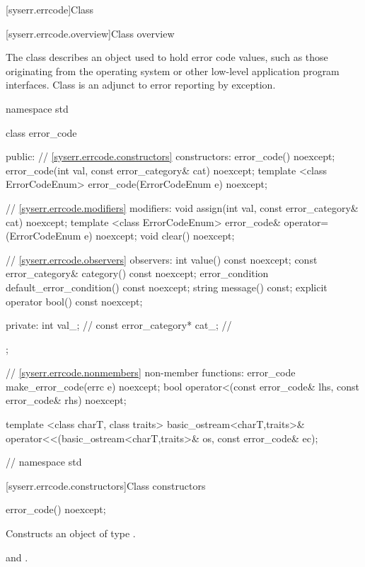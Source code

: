 [syserr.errcode]{Class }

[syserr.errcode.overview]{Class  overview}

\pnum
The class  describes an object used to hold error code
values, such as those originating from the operating system or other low-level
application program interfaces. \enternote Class  is an
adjunct to error reporting by exception. \exitnote

%
\begin{codeblock}
namespace std {
  class error_code {
  public:
    // \ref{syserr.errcode.constructors} constructors:
    error_code() noexcept;
    error_code(int val, const error_category& cat) noexcept;
    template <class ErrorCodeEnum>
      error_code(ErrorCodeEnum e) noexcept;

    // \ref{syserr.errcode.modifiers} modifiers:
    void assign(int val, const error_category& cat) noexcept;
    template <class ErrorCodeEnum>
        error_code& operator=(ErrorCodeEnum e) noexcept;
    void clear() noexcept;

    // \ref{syserr.errcode.observers} observers:
    int value() const noexcept;
    const error_category& category() const noexcept;
    error_condition default_error_condition() const noexcept;
    string message() const;
    explicit operator bool() const noexcept;

  private:
    int val_;                   // \expos
    const error_category* cat_; // \expos
  };

  // \ref{syserr.errcode.nonmembers} non-member functions:
  error_code make_error_code(errc e) noexcept;
  bool operator<(const error_code& lhs, const error_code& rhs) noexcept;

  template <class charT, class traits>
    basic_ostream<charT,traits>&
      operator<<(basic_ostream<charT,traits>& os, const error_code& ec);
}   // namespace std
\end{codeblock}

[syserr.errcode.constructors]{Class  constructors}

\begin{itemdecl}
error_code() noexcept;
\end{itemdecl}

\begin{itemdescr}
\pnum
\effects Constructs an object of type .

\pnum
\postconditions {} and .
\end{itemdescr}

